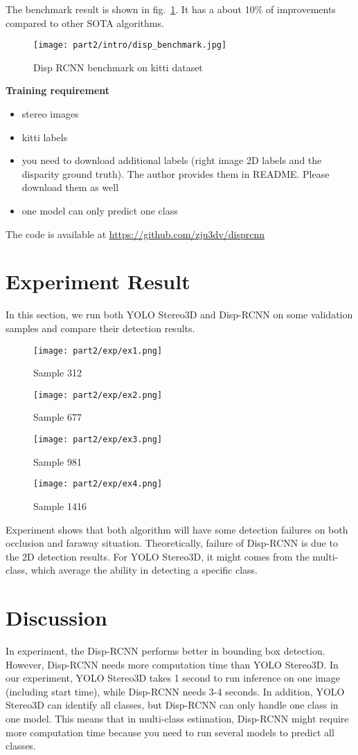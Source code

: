 \documentclass[12pt]{article}
\begin{document}
The benchmark result is shown in fig.~\ref{disp_bench}. It has a about 10\% of improvements compared to other SOTA algorithms.
\begin{figure}[H]
    \centering
    \texttt{[image: part2/intro/disp\_benchmark.jpg]}
    \caption{Disp RCNN benchmark on kitti dataset}
    \label{disp_bench}
\end{figure}
\textbf{Training requirement}
\begin{itemize}
    \item stereo images
    \item kitti labels
    \item you need to download additional labels (right image 2D labels and the disparity ground truth). The author provides them in README. Please download them as well
    \item one model can only predict one class
\end{itemize}
The code is available at \url{https://github.com/zju3dv/disprcnn}
\section{Experiment Result}
In this section, we run both YOLO Stereo3D and Disp-RCNN on some validation samples and compare their detection results.
\begin{figure}[H]
    \centering
    \texttt{[image: part2/exp/ex1.png]}
    \caption{Sample 312}
    \label{ex1}
\end{figure}
\begin{figure}[H]
    \centering
    \texttt{[image: part2/exp/ex2.png]}
    \caption{Sample 677}
    \label{ex2}
\end{figure}
\begin{figure}[H]
    \centering
    \texttt{[image: part2/exp/ex3.png]}
    \caption{Sample 981}
    \label{ex3}
\end{figure}
\begin{figure}[H]
    \centering
    \texttt{[image: part2/exp/ex4.png]}
    \caption{Sample 1416}
    \label{ex4}
\end{figure}
Experiment shows that both algorithm will have some detection failures on both occlusion and faraway situation. Theoretically, failure of Disp-RCNN is due to the 2D detection results. For YOLO Stereo3D, it might comes from the multi-class, which average the ability in detecting a specific class.
\section{Discussion}
In experiment, the Disp-RCNN performs better in bounding box detection. However, Disp-RCNN needs more computation time than YOLO Stereo3D. In our experiment, YOLO Stereo3D takes 1 second to run inference on one image (including start time), while Disp-RCNN needs 3-4 seconds. In addition, YOLO Stereo3D can identify all classes, but Disp-RCNN can only handle one class in one model. This means that in multi-class estimation, Disp-RCNN might require more computation time because you need to run several models to predict all classes.
\end{document}
